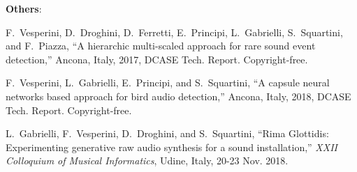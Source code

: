 \newpage
\textbf{Others}:
\begin{list}{[]~}{}
\item
F.~Vesperini, D.~Droghini, D.~Ferretti, E.~Principi, L.~Gabrielli, S.~Squartini, and F.~Piazza, ``A hierarchic multi-scaled approach for rare sound event detection,'' Ancona, Italy, 2017, {DCASE} {T}ech. {R}eport. {C}opyright-free.

\item 
F.~Vesperini, L.~Gabrielli, E.~Principi, and S.~Squartini, ``A capsule neural networks based approach for bird audio detection,'' Ancona, Italy, 2018, {DCASE} {T}ech. {R}eport. {C}opyright-free.

\item
L.~Gabrielli, F.~Vesperini, D.~Droghini, and S.~Squartini, ``Rima {G}lottidis: Experimenting generative raw audio synthesis for a sound installation,'' \emph{XXII Colloquium of Musical Informatics}, Udine, Italy, 20-23 Nov. 2018.

\end{list}
	




